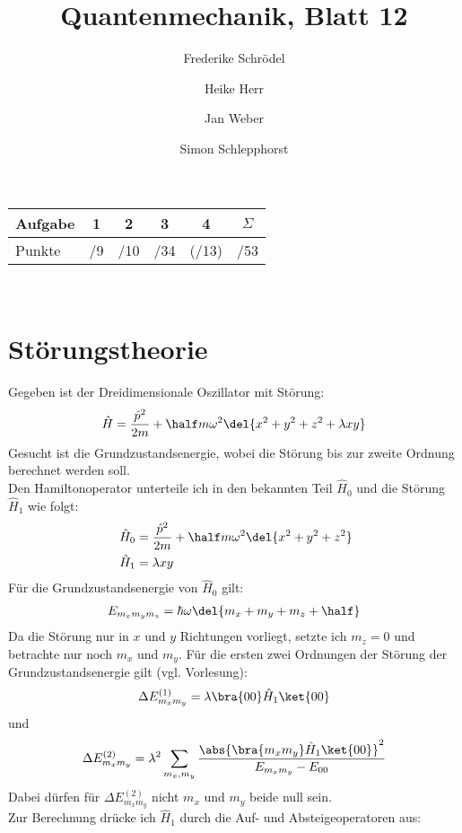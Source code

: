 \documentclass[11pt, ngerman, fleqn, DIV=15, headinclude]{scrartcl}
\title{Quantenmechanik, Blatt 12}
\author{
    Frederike Schrödel \and Heike Herr \and Jan Weber \and Simon Schlepphorst
}
\begin{document}
\maketitle
\begin{center}
	\begin{tabular}{l|c|c|c|c|c}
		Aufgabe &1&2&3&4&$\Sigma$\\
		\hline
		Punkte &\quad /9 & \quad /10 & \quad /34 &(\quad /13) & \quad
		/53
	\end{tabular}\\
\end{center}

\section{Störungstheorie}

Gegeben ist der Dreidimensionale Oszillator mit Störung:
\begin{align*}
	\hat{H} = \frac{\hat{p}^2}{2m} + \half m\omega^2\del{x^2 + y^2 + z^2 + \lambda xy}
\end{align*}
Gesucht ist die Grundzustandsenergie, wobei die Störung bis zur zweite Ordnung berechnet werden soll.\\
Den Hamiltonoperator unterteile ich in den bekannten Teil $\hat{H}_0$ und die Störung $\hat{H}_1$ wie folgt:
\begin{align*}
	&\hat{H}_0 = \frac{\hat{p}^2}{2m} + \half m\omega^2\del{x^2 + y^2 + z^2}\\\
	&\hat{H}_1 = \lambda xy
\end{align*}
Für die Grundzustandsenergie von $\hat{H}_0$ gilt:
\begin{align*}
	E_{m_xm_ym_z} = \hbar\omega\del{m_x + m_y + m_z + \half}
\end{align*}
Da die Störung nur in $x$ und $y$ Richtungen vorliegt, setzte ich $m_z = 0$ und betrachte nur noch $m_x$ und $m_y$. Für die ersten zwei Ordnungen der Störung der Grundzustandsenergie gilt (vgl. Vorlesung):
\begin{align*}
	\Delta E_{m_xm_y}^{(1)} = \lambda\bra{00}\hat{H}_1\ket{00}
\end{align*}
und
\begin{align*}
	\Delta E_{m_xm_y}^{(2)} = \lambda^2\sum_{m_x,m_y}\frac{\abs{\bra{m_xm_y}\hat{H}_1\ket{00}}^2}{E_{m_xm_y} - E_{00}}
\end{align*}
Dabei dürfen für $\Delta E_{m_xm_y}^{(2)}$ nicht $m_x$ und $m_y$ beide null sein.\\
Zur Berechnung drücke ich $\hat{H}_1$ durch die Auf- und Absteigeoperatoren aus:
\end{document}
